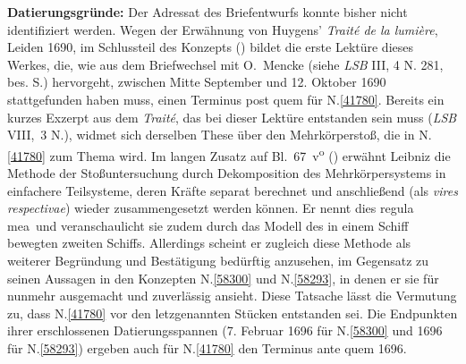 \begin{ledgroup}
\footnotesize
\pstart
\noindent%
\textbf{Datierungsgründe:}
Der Adressat des Briefentwurfs konnte bisher nicht identifiziert werden.
Wegen der Erwähnung von
Huygens' %
\cite{00525}\textit{Traité de la lumière}, Leiden 1690,
im Schlussteil des Konzepts ()
bildet die erste Lektüre dieses Werkes, die, wie 
aus dem Briefwechsel mit O.~Mencke
(siehe \textit{LSB} III, 4 N. 281, bes. S.) 
hervorgeht,
zwischen Mitte September und 12. Oktober 1690 stattgefunden haben muss, 
einen Terminus post quem für N.\;\ref{41780}.
Bereits ein kurzes Exzerpt aus dem \textit{Traité}, das bei dieser Lektüre entstanden sein muss (\cite{02094}\textit{LSB} VIII,~3 N.), widmet sich derselben These über den Mehrkörperstoß, die  in N.\;\ref{41780} zum Thema wird.
\pend
\pstart			
Im langen Zusatz auf Bl.~67~v\textsuperscript{o} ()
erwähnt Leibniz die Methode der Stoßuntersuchung durch Dekomposition des Mehrkörpersystems in einfachere Teilsysteme, deren Kräfte separat berechnet und anschließend (als \textit{vires respectivae}) wieder zusammengesetzt werden können. Er nennt dies \glqq regula mea\grqq\ und veranschaulicht sie zudem durch das Modell des in einem Schiff bewegten zweiten Schiffs.
Allerdings scheint er zugleich diese Methode als weiterer Begründung und Bestätigung bedürftig anzusehen, im Gegensatz zu seinen Aussagen in den Konzepten N.\;\ref{58300} und N.\;\ref{58293}, in denen er sie für nunmehr ausgemacht und zuverlässig ansieht.
Diese Tatsache lässt die Vermutung zu, dass N.\;\ref{41780} vor den letzgenannten Stücken entstanden sei. Die Endpunkten ihrer erschlossenen Datierungsspannen (7. Februar 1696 für N.\;\ref{58300} und  1696 für N.\;\ref{58293}) ergeben auch für N.\;\ref{41780} den Terminus ante quem 1696.
\pend
\end{ledgroup}
\vspace{8mm}
\pstart%
\normalsize%
\noindent%
